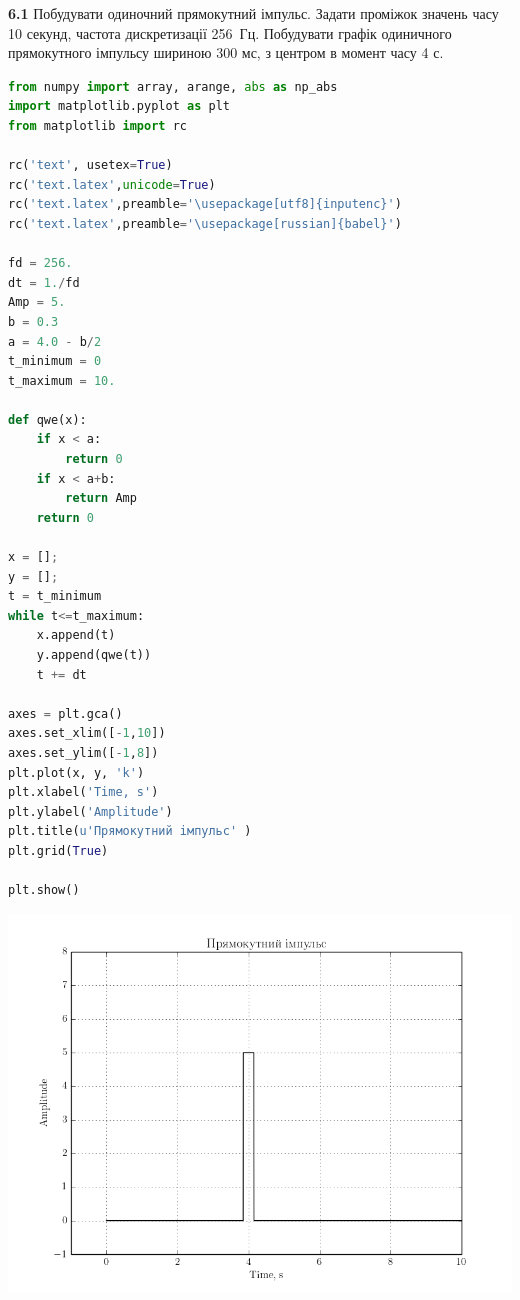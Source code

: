 \documentclass[a4paper,12pt]{article}
\begin{document}
\textbf{6.1} Побудувати одиночний прямокутний імпульс. Задати проміжок значень часу 10 секунд, частота дискретизації 256 Гц. Побудувати графік одиничного прямокутного імпульсу шириною 300 мс, з центром в момент часу 4 с.\par

\begin{lstlisting}[language=Python]
from numpy import array, arange, abs as np_abs
import matplotlib.pyplot as plt
from matplotlib import rc

rc('text', usetex=True)
rc('text.latex',unicode=True)
rc('text.latex',preamble='\usepackage[utf8]{inputenc}')
rc('text.latex',preamble='\usepackage[russian]{babel}')

fd = 256.
dt = 1./fd
Amp = 5.
b = 0.3
a = 4.0 - b/2
t_minimum = 0
t_maximum = 10.

def qwe(x):
    if x < a:
        return 0
    if x < a+b:
        return Amp
    return 0

x = [];
y = [];
t = t_minimum
while t<=t_maximum:
    x.append(t)
    y.append(qwe(t))
    t += dt

axes = plt.gca()
axes.set_xlim([-1,10])
axes.set_ylim([-1,8])
plt.plot(x, y, 'k')
plt.xlabel('Time, s')
plt.ylabel('Amplitude')
plt.title(u'Прямокутний iмпульс' )
plt.grid(True)

plt.show()

\end{lstlisting}
\begin{center}
\includegraphics[height = 11.5 cm,width=15 cm]{6.1f.png}
\end{center}
\end{document}
